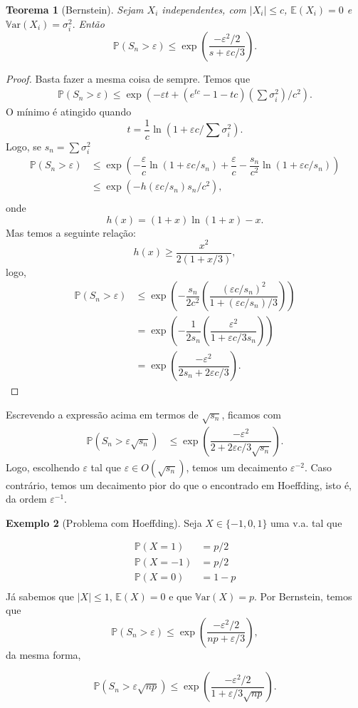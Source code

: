 \documentclass[12pt,a4paper,oneside]{book}
\newtheorem{theorem}{Teorema}[section]
\theoremstyle{definition}
\newtheorem{example}[theorem]{Exemplo}
\theoremstyle{remark}
\numberwithin{equation}{section}
\newcommand{\e}{\varepsilon}
\newcommand{\E}{\mathbb{E}}
\newcommand{\pr}{\mathbb{P}}
\newcommand{\Var}{\mathbb{V}\text{ar}}
\begin{document}
\begin{theorem}[Bernstein] Sejam $X_i$ independentes, com $|X_i|\leq c$, $\E(X_i)=0$ e  $\Var(X_i) = \sigma_i^2.$ Então
$$\pr(S_n>\e)\leq \exp\left( \dfrac{-\e^2/2 }{s + \e c/3}  \right). $$

\end{theorem}
\begin{proof}
Basta fazer a mesma coisa de sempre. Temos que
\begin{align*}
\pr(S_n >\e) \leq \exp (-\e t + (e^{tc}-1-tc)(\sum\sigma_i^2)/c^2).
\end{align*}
O mínimo é atingido quando 
$$t= \dfrac{1}{c}\ln\left(1 +  \e c/\sum\sigma_i^2  \right). $$
Logo, se $s_n= \sum\sigma_i^2$
\begin{align*}
\pr(S_n >\e) &\leq  \exp( -\dfrac{\e}{c}\ln(1+\e c/s_n) +\dfrac{\e}{c}  - \dfrac{s_n}{c^2}\ln(1+ \e c /s_n) ) \\
& \leq \exp( - h(\e c/s_n)s_n/c^2), \\
\end{align*}
onde
$$ h(x) = (1+x)\ln(1+x)-x .$$
Mas temos a seguinte relação:
$$ h(x)\geq \dfrac{x^2}{2(1+x/3)},$$
logo,
\begin{align*}
\pr(S_n >\e) &\leq \exp\left(-\dfrac{s_n}{2c^2}\left( \dfrac{(\e c/s_n)^2}{1+ (\e c/s_n)/3}  \right)\right) \\
& = \exp\left(-\dfrac{1}{2s_n}\left( \dfrac{\e^2 }{1+ \e c/3s_n}  \right)\right)\\
& = \exp\left( \dfrac{-\e^2 }{2s_n + 2\e c/3}  \right).
\end{align*}
\end{proof}
\begin{tcolorbox}[colback = yellow!60]

Escrevendo a expressão acima em termos de $\sqrt{s_n}$, ficamos com
\begin{align*}
\pr(S_n >\e\sqrt{s_n}) & \leq  \exp\left( \dfrac{-\e^2 }{2 + 2\e c/3\sqrt{s_n}}  \right).
\end{align*}
Logo, escolhendo $\e$ tal que $\e\in O(\sqrt{s_n})$, temos um decaimento $\e^{-2}$.
Caso contrário, temos um decaimento pior do que o encontrado em Hoeffding, isto é, da ordem $\e^{-1}$.
\end{tcolorbox}

\begin{tcolorbox}
\begin{example}[Problema com Hoeffding]
 Seja $X\in\{-1,0,1\}$ uma v.a. tal que 

$$
\begin{array}{llr}
\pr(X=1) &= p/2 \\
\pr(X=-1) &= p/2 \\
 \pr(X=0) &= 1 -p\\
\end{array}
$$
Já sabemos que $|X|\leq 1$,  $\E(X)=0$ e que $\Var(X) = p.$ 
Por Bernstein, temos que
$$\pr(S_n>\e)\leq \exp\left( \dfrac{-\e^2/2 }{np + \e/3}  \right), $$
da mesma forma, 

$$\pr(S_n>\e\sqrt{np})\leq \exp\left( \dfrac{-\e^2/2 }{1 + \e/3\sqrt{np}}  \right). $$
\end{example}

\end{tcolorbox}
\end{document}

